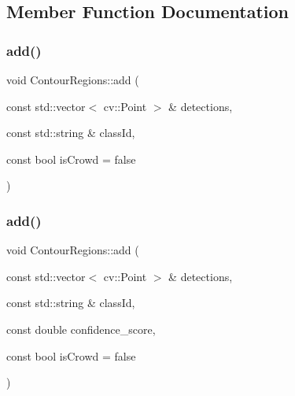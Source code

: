\subsection{Member Function Documentation}
\mbox{\label{struct_contour_regions_aeb483510869f1dcb141b26043eaf12f0}} 
\subsubsection{\texorpdfstring{add()}{add()}\hspace{0.1cm}{\footnotesize\ttfamily [1/2]}}
{\footnotesize\ttfamily void Contour\+Regions\+::add (\begin{DoxyParamCaption}\item[{const std\+::vector$<$ cv\+::\+Point $>$ \&}]{detections,  }\item[{const std\+::string \&}]{class\+Id,  }\item[{const bool}]{is\+Crowd = {\ttfamily false} }\end{DoxyParamCaption})}

\mbox{\label{struct_contour_regions_a77160c9738d01939d6b99588da777be5}} 
\subsubsection{\texorpdfstring{add()}{add()}\hspace{0.1cm}{\footnotesize\ttfamily [2/2]}}
{\footnotesize\ttfamily void Contour\+Regions\+::add (\begin{DoxyParamCaption}\item[{const std\+::vector$<$ cv\+::\+Point $>$ \&}]{detections,  }\item[{const std\+::string \&}]{class\+Id,  }\item[{const double}]{confidence\+\_\+score,  }\item[{const bool}]{is\+Crowd = {\ttfamily false} }\end{DoxyParamCaption})}

\mbox{\label{struct_contour_regions_a4f77a669499f53d59e51aa30ec040bc6}} 
